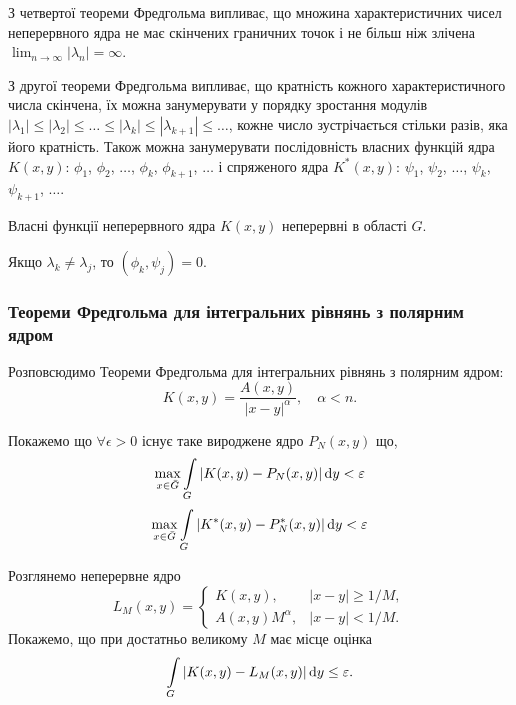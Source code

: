 \begin{corollary}
	З четвертої теореми Фредгольма випливає, що множина характеристичних чисел неперервного ядра не має скінчених граничних точок і не більш ніж злічена $\lim_{n \to \infty} |\lambda_n| = \infty$.
\end{corollary}
\begin{corollary}
	З другої теореми Фредгольма випливає, що кратність кожного характеристичного числа скінчена, їх можна занумерувати у порядку зростання модулів $|\lambda_1| \le |\lambda_2| \le \ldots \le |\lambda_k| \le |\lambda_{k + 1}| \le \ldots$, кожне число зустрічається стільки разів, яка його кратність. Також можна занумерувати послідовність власних функцій ядра $K(x, y)$: $\phi_1$, $\phi_2$, $\ldots$, $\phi_k$, $\phi_{k + 1}$, $\ldots$ і спряженого ядра $K^*(x, y)$: $\psi_1$, $\psi_2$, $\ldots$, $\psi_k$, $\psi_{k + 1}$, $\ldots$.
\end{corollary}
\begin{corollary}
	Власні функції неперервного ядра $K(x, y)$ неперервні в області $G$.
\end{corollary}
\begin{corollary}
	Якщо $\lambda_k \ne \lambda_j$, то $(\phi_k, \psi_j) = 0$.
\end{corollary}

\subsubsection{Теореми Фредгольма для інтегральних рівнянь з полярним ядром}

Розповсюдимо Теореми Фредгольма для інтегральних рівнянь з полярним ядром:
\begin{equation}
	\label{eq:2.21}
	K(x, y) = \dfrac{A(x, y)}{|x - y|^\alpha}, \quad \alpha < n.
\end{equation}

Покажемо що $\forall \epsilon > 0$ існує таке вироджене ядро $P_N(x, y)$ що,
\begin{equation}
	\label{eq:2.22}
	\displaystyle\max\limits_{x \in \bar G} \displaystyle\int\limits_G |K(x, y) - P_N(x, y)| \mathop{}\!\mathrm{d} y < \varepsilon
\end{equation}
\begin{equation}
	\label{eq:2.22'}
	\displaystyle\max\limits_{x \in \bar G} \displaystyle\int\limits_G |K^*(x, y) - P_N^*(x, y)| \mathop{}\!\mathrm{d} y < \varepsilon
\end{equation}

Розглянемо неперервне ядро
\begin{equation}
	\label{eq:2.23}
	L_M(x, y) = \begin{cases}
		K(x, y), & |x - y| \ge 1 / M, \\
		A(x, y) M^\alpha, & |x - y| < 1 / M.
	\end{cases}
\end{equation}
Покажемо, що при достатньо великому $M$ має місце оцінка \[ \displaystyle\int\limits_G |K(x, y) - L_M(x, y)| \mathop{}\!\mathrm{d} y \le \varepsilon. \]

